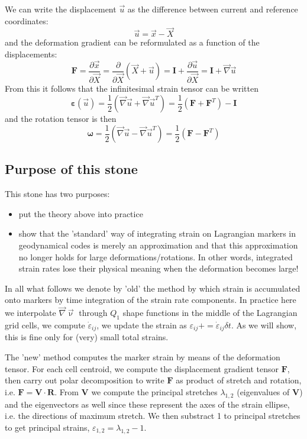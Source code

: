 We can write the displacement $\vec{u}$ as the difference between current and reference coordinates:
\[
\vec{u} = \vec{x}-\vec{X}
\]
and the deformation gradient can be reformulated as a function of the displacements:
\[
{\bm F} 
= \frac{\partial \vec{x}}{\partial \vec{X}} 
= \frac{\partial }{\partial \vec{X}} (\vec{X}+\vec{u})
= {\bm I} + \frac{\partial \vec{u}}{\partial \vec{X}} 
= {\bm I} + \vec{\nabla}\vec{u} 
\]
From this it follows that the infinitesimal strain tensor can be written
\[
\boxed{
{\bm \varepsilon}(\vec{u}) = \frac{1}{2}( \vec\nabla\vec{u} + \vec\nabla\vec{u}^T )
= \frac{1}{2} (  {\bm F} +  {\bm F}^T) - {\bm I} 
}
\]
and the rotation tensor is then 
\[
{\bm \omega} 
=\frac{1}{2}( \vec\nabla\vec{u} - \vec\nabla\vec{u}^T )
= \frac{1}{2} (  {\bm F} -  {\bm F}^T)
\]



\subsection*{Purpose of this stone}

This stone has two purposes:
\begin{itemize}
\item put the theory above into practice 
\item show that the 'standard' way of integrating strain on Lagrangian markers in 
geodynamical codes is merely an approximation and that this approximation 
no longer holds for large deformations/rotations. In other words, 
integrated strain rates lose their physical meaning when 
the deformation becomes large!
\end{itemize}

In all what follows we denote by 'old' the method by which 
strain is accumulated onto markers by time integration of the strain rate components.
In practice here we interpolate $\vec\nabla \vec\upnu $ through $Q_1$ shape functions
in the middle of the Lagrangian grid cells, we compute $\dot{\varepsilon}_{ij}$, we
update the strain as $\varepsilon_{ij} += \dot{\varepsilon}_{ij} \delta t$.
As we will show, this is fine only for (very) small total strains. 

The 'new' method computes the marker strain by means 
of the deformation tensor.
For each cell centroid, we compute the displacement gradient tensor ${\bm F}$, 
then carry out polar decomposition to write ${\bm F}$ as product of stretch and rotation, 
i.e. ${\bm F}=  {\bm V}\cdot {\bm R}$.
From ${\bm V}$ we compute the principal stretches $\lambda_{1,2}$ (eigenvalues of ${\bm V}$) 
and the eigenvectors as well since these represent the axes of the strain ellipse, 
i.e. the directions of maximum stretch.
We then substract 1 to principal stretches to get principal strains, $\varepsilon_{1,2} = \lambda_{1,2}-1$.

